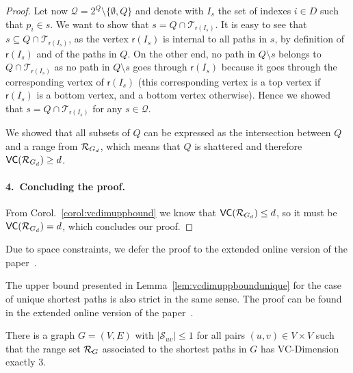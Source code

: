 \begin{proof}
  Let now $\mathcal{Q}=2^{Q}\setminus\{\emptyset,Q\}$ and denote with $I_s$
  the set of indexes $i\in D$ such that $p_i\in s$. We want to show that
  $s=Q\cap\mathcal{T}_{\mathsf{r}(I_s)}$. It is easy to see that $s\subseteq
  Q\cap\mathcal{T}_{\mathsf{r}(I_s)}$, as the vertex $\mathsf{r}(I_s)$ is
  internal to all paths in $s$, by definition of $\mathsf{r}(I_s)$ and of the
  paths in $Q$. On the other end, no path in $Q\setminus s$ belongs to
  $Q\cap\mathcal{T}_{\mathsf{r}(I_s)}$ as no path in $Q\setminus s$ goes through
  $\mathsf{r}(I_s)$ because it goes through the corresponding vertex of
  $\mathsf{r}(I_s)$ (this corresponding vertex is a top vertex if
  $\mathsf{r}(I_s)$ is a bottom vertex, and a bottom vertex otherwise). Hence we
  showed that $s=Q\cap\mathcal{T}_{\mathsf{r}(I_s)}$
  for any $s\in\mathcal{Q}$.
  
  We showed that all subsets of $Q$ can be expressed as the intersection between
  $Q$ and a range from $\mathcal{R}_{G_d}$, which means that $Q$ is shattered and
  therefore $\mathsf{VC}(\mathcal{R}_{G_d})\ge d$.
  
  \paragraph{4.~Concluding the proof.} From Corol.~\ref{corol:vcdimuppbound} we
  know that $\mathsf{VC}(\mathcal{R}_{G_d})\le d$, so it must be $\mathsf{VC}(\mathcal{R}_{G_d})=d$, which
  concludes our proof.
\end{proof}
\else
Due to space constraints, we defer the proof to the extended online version of
the paper~\citep{RiondatoK13}.
\fi

The upper bound presented in Lemma~\ref{lem:vcdimuppboundunique}  for the case
of unique shortest paths is also strict in the same sense.
\ifproof
\else
The proof can be found in the extended online version of the
paper~\citep{RiondatoK13}.
\fi

\begin{lemma}\label{lem:vcdimlowboundunique}
  There is a graph $G=(V,E)$ with $|\mathcal{S}_{uv}|\le1$ for all
  pairs $(u,v)\in V\times V$ such that the range set $\mathcal{R}_G$ associated to the
  shortest paths in $G$ has VC-Dimension exactly $3$.
\end{lemma}

